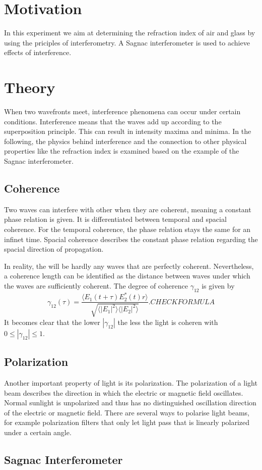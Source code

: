 \section{Motivation}
\label{sec:Motivation}
In this experiment we aim at determining the refraction index of air and glass by using the priciples of interferometry. A Sagnac interferometer is used to achieve
effects of interference.

\section{Theory}
\label{sec:Theory}
When two wavefronts meet, interference phenomena can occur under certain conditions. Interference means that the waves add up according to the superposition principle. This can result in
intensity maxima and minima.
In the following, the physics behind interference and the connection to other physical properties like the refraction index is examined based on the example of the Sagnac interferometer.

\subsection{Coherence}
\label{sec:Coherence}
Two waves can interfere with other when they are coherent, meaning a constant phase relation is given. It is differentiated between temporal and spacial coherence. For the temporal
coherence, the phase relation stays the same for an infinet time. Spacial coherence describes the constant phase relation regarding the spacial direction of propagation.

In reality, the will be hardly any waves that are perfectly coherent. Nevertheless, a coherence length can be identified as the distance between waves under which the waves are sufficiently
coherent. The degree of coherence $\gamma_{12}$ is given by
\begin{equation*}
    \gamma_{12}(\tau)= \frac{\langle E_1(t+\tau)E^{*}_2(t) r \rangle}{\sqrt{\langle|E_1|^2\rangle\langle|E_2|^2\rangle}}. CHECK FORMULA
\end{equation*}
It becomes clear that the lower $|\gamma_{12}|$ the less the light is coheren with $0≤|\gamma_{12}|≤1$.

\subsection{Polarization}
\label{sec:Polarization}
Another important property of light is its polarization. The polarization of a light beam describes the direction in which the electric or magnetic field oscillates. Normal sunlight 
is unpolarized and thus has no distinguished oscillation direction of the electric or magnetic field. There are several ways to polarise light beams, for example polarization filters that only
let light pass that is linearly polarized under a certain angle.

\subsection{Sagnac Interferometer}
\label{sec:Sagnac_Interferometer}
